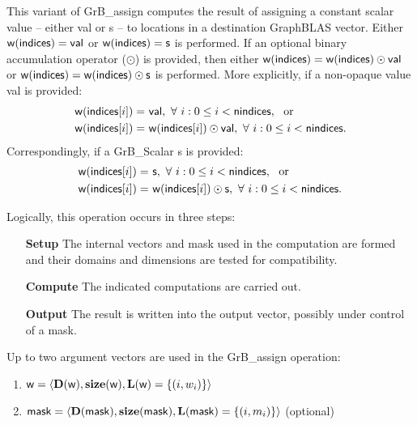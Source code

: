 This variant of {\sf GrB\_assign} computes the result of assigning a constant
scalar value -- either {\sf val} or {\sf s} -- to locations in a destination GraphBLAS vector.
Either 
${\sf w}({\sf indices}) = {\sf val}$ or ${\sf w}({\sf indices}) = {\sf s}$ is performed.
If an optional binary accumulation 
operator ($\odot$) is provided, then either
${\sf w}({\sf indices}) = {\sf w}({\sf indices}) \odot {\sf val}$ or
${\sf w}({\sf indices}) = {\sf w}({\sf indices}) \odot {\sf s}$ is performed.  
More explicitly, if a non-opaque value {\sf val} is provided:
\[
\begin{aligned}
    {\sf w}({\sf indices}[i]) = &\ {\sf val}, \ 
    \forall \  i : 0 \leq i < {\sf nindices}, \mbox{~~or~~}
    \\
    {\sf w}({\sf indices}[i]) = &\ {\sf w}({\sf indices}[i]) \odot {\sf val}, \ 
    \forall \  i : 0 \leq i < {\sf nindices}.
\end{aligned}
\]
Correspondingly, if a {\sf GrB\_Scalar} {\sf s} is provided:
\[
\begin{aligned}
    {\sf w}({\sf indices}[i]) = &\ {\sf s}, \ 
    \forall \  i : 0 \leq i < {\sf nindices}, \mbox{~~or~~}
    \\
    {\sf w}({\sf indices}[i]) = &\ {\sf w}({\sf indices}[i]) \odot {\sf s}, \ 
    \forall \  i : 0 \leq i < {\sf nindices}.
\end{aligned}
\]

Logically, this operation occurs in three steps:
\begin{enumerate}[leftmargin=0.75in]
\item[\bf Setup] The internal vectors and mask used in the computation are formed 
and their domains and dimensions are tested for compatibility.
\item[\bf Compute] The indicated computations are carried out.
\item[\bf Output] The result is written into the output vector, possibly under 
control of a mask.
\end{enumerate}

Up to two argument vectors are used in the {\sf GrB\_assign} operation:
\begin{enumerate}
	\item ${\sf w} = \langle \bold{D}({\sf w}),\bold{size}({\sf w}),
    \bold{L}({\sf w}) = \{(i,w_i) \} \rangle$

	\item ${\sf mask} = \langle \bold{D}({\sf mask}),\bold{size}({\sf mask}),
    \bold{L}({\sf mask}) = \{(i,m_i) \} \rangle$ (optional)
\end{enumerate}

